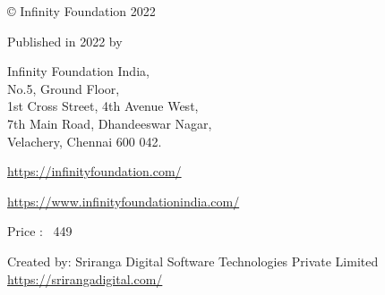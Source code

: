 \thispagestyle{empty}\label{copyright}

© Infinity Foundation 2022

Published in 2022 by

Infinity Foundation India,\\ No.5, Ground Floor,\\ 1st Cross Street, 4th Avenue West,\\ 7th Main Road, Dhandeeswar Nagar,\\ Velachery, Chennai 600 042.

\url{https://infinityfoundation.com/}

\url{https://www.infinityfoundationindia.com/}

\bigskip



\bigskip

Price : {\rupee~449}


Created by: Sriranga Digital Software Technologies Private Limited
\url{https://srirangadigital.com/}


\label{endcopyright}







